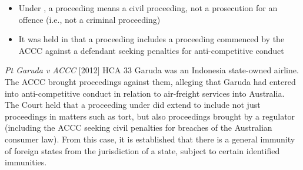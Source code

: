 \begin{itemize}
    \item Under , a proceeding means a civil proceeding, not a prosecution for an offence (i.e., not a criminal proceeding)
    \item It was held in  that a proceeding includes a proceeding commenced by the ACCC against a defendant seeking penalties for anti-competitive conduct
\end{itemize}

\begin{casedetails}{\textit{Pt Garuda v ACCC} [2012] HCA 33}
    \flushleft
    Garuda was an Indonesia state-owned airline. The ACCC brought proceedings against them, alleging that Garuda had entered into anti-competitive conduct in relation to air-freight services into Australia. The Court held that a proceeding under  did extend to include not just proceedings in matters such as tort, but also proceedings brought by a regulator (including the ACCC seeking civil penalties for breaches of the Australian consumer law). From this case, it is established that there is a general immunity of foreign states from the jurisdiction of a state, subject to certain identified immunities.
\end{casedetails}

